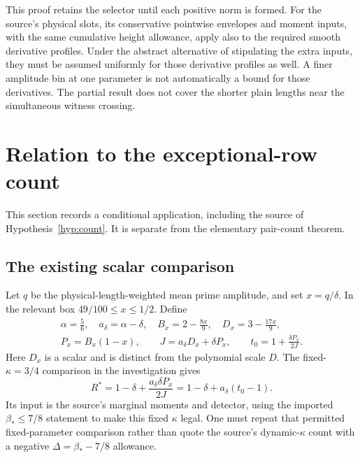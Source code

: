 \documentclass[11pt]{article}
\theoremstyle{definition}
\theoremstyle{remark}
\numberwithin{equation}{section}
\begin{document}
This proof retains the selector until each positive norm is formed.
For the source's physical slots, its conservative pointwise envelopes
and moment inputs, with the same cumulative height allowance, apply
also to the required smooth derivative profiles. Under the abstract
alternative of stipulating the extra inputs, they must be assumed
uniformly for those derivative profiles as well.
A finer amplitude bin at one parameter is not automatically a bound
for those derivatives. The partial result does not cover the shorter
plain lengths near the simultaneous witness crossing.

\section{Relation to the exceptional-row count}\label{sec:application}

This section records a conditional application, including the source
of Hypothesis~\ref{hyp:count}. It is separate from the elementary
pair-count theorem.

\subsection{The existing scalar comparison}

Let $q$ be the physical-length-weighted mean prime amplitude, and set
$x=q/\delta$. In the relevant box $49/100\le x\le1/2$. Define
\begin{equation}\label{eq:scalar-params}
\begin{gathered}
\alpha=\frac56,\quad a_\delta=\alpha-\delta,\quad
B_x=2-\frac{8x}{9},\quad D_x=3-\frac{17x}{9},\\
P_x=B_x(1-x),\qquad J=a_\delta D_x+\delta P_x,\qquad
t_0=1+\frac{\delta P_x}{2J}.
\end{gathered}
\end{equation}
Here $D_x$ is a scalar and is distinct from the polynomial scale $D$.
The fixed-$\kappa=3/4$ comparison in the investigation gives
\begin{equation}\label{eq:Rstar}
R^*=1-\delta+\frac{a_\delta\delta P_x}{2J}
=1-\delta+a_\delta(t_0-1).
\end{equation}
Its input is the source's marginal moments and detector, using the
imported $\beta_*\le7/8$ statement to make this fixed $\kappa$ legal.
One must repeat that permitted fixed-parameter comparison rather than
quote the source's dynamic-$\kappa$ count with a negative
$\Delta=\beta_*-7/8$ allowance.
\end{document}
